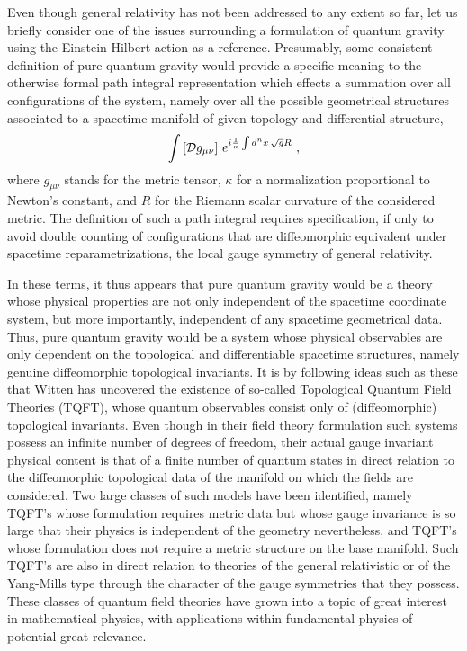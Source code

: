 \documentclass[a4paper,11pt]{article}
\begin{document}
Even though general relativity has not been addressed to any extent so far,
let us briefly consider one of the issues surrounding a formulation of
quantum gravity using the Einstein-Hilbert action as a reference.
Presumably, some consistent definition of pure quantum gravity would
provide a specific meaning to the otherwise formal path integral
representation which effects a summation over all configurations of
the system, namely over all the possible geometrical structures associated
to a spacetime manifold of given topology and differential structure,
\begin{equation}
\int\left[{\cal D}g_{\mu\nu}\right]\,
e^{i\frac{1}{\kappa}\int d^nx\,\sqrt{g}R}\ ,
\end{equation}
where $g_{\mu\nu}$ stands for the metric tensor, $\kappa$ for a normalization
proportional to Newton's constant, and $R$ for the Riemann scalar curvature
of the con\-si\-de\-red metric. The definition of such a path integral requires
specification, if only to avoid double counting of configurations that
are diffeomorphic equivalent under spacetime reparametrizations, the local
gauge symmetry of general relativity.

In these terms, it thus appears that pure quantum gravity would be a theory 
whose physical properties are not only independent of the spacetime coordinate
system, but more importantly, independent of any spacetime geometrical
data.\cite{Wit1,Wit2} Thus, pure quantum gravity would be a system whose 
physical observables are only dependent on the topological and differentiable
spacetime structures, namely genuine diffeomorphic topological invariants.
It is by following ideas such as these that Witten has uncovered the
existence of so-called Topological Quantum Field Theories (TQFT), whose
quantum observables consist only of (diffeomorphic) topological 
invariants.\cite{Wit1,Wit2,TQFT}
Even though in their field theory formulation such systems possess an
infinite number of degrees of freedom, their actual gauge invariant
physical content is that of a finite number of quantum states in direct
relation to the diffeomorphic topological data of the manifold on which
the fields are considered. Two large classes of such models have been
identified,\cite{TQFT} namely TQFT's whose formulation requires metric data 
but whose gauge invariance is so large that their physics is independent
of the geometry nevertheless, and TQFT's whose formulation does not
require a metric structure on the base manifold. Such TQFT's are also
in direct relation to theories of the general relativistic or of the
Yang-Mills type through the character of the gauge symmetries that they 
possess. These classes of quantum field theories have grown into a topic
of great interest in mathematical physics, with applications
within fundamental physics of potential great relevance.
\end{document}
